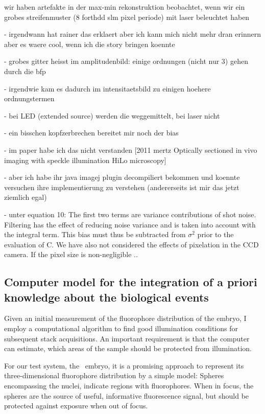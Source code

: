 {\color{red} wir haben artefakte in der max-min rekonstruktion
beobachtet, wenn wir ein grobes streifenmuster (8 forthdd slm pixel
periode) mit laser beleuchtet haben

     - irgendwann hat rainer das erklaert aber ich kann mich nicht
mehr dran erinnern aber es waere cool, wenn ich die story bringen
koennte
     
- grobes gitter heisst im amplitudenbild: einige ordnungen (nicht nur
3) gehen durch die bfp

     - irgendwie kam es dadurch im intensitaetsbild zu einigen hoehere
ordnungstermen

     - bei LED (extended source) werden die weggemittelt, bei laser
nicht

       - ein bisschen kopfzerbrechen bereitet mir noch der bias

       - im paper habe ich das nicht verstanden [2011 mertz Optically
sectioned in vivo imaging with speckle illumination HiLo microscopy]

       - aber ich habe ihr java imagej plugin decompiliert bekommen
und koennte versuchen ihre implementierung zu verstehen (andererseits
ist mir das jetzt ziemlich egal)

       - unter equation 10: The first two terms are variance
contributions of shot noise. Filtering has the effect of reducing
noise variance and is taken into account with the integral term. This
bias must thus be subtracted from $\sigma^2$ prior to the evaluation
of C. We have also not considered the effects of pixelation in the CCD
camera. If the pixel size is non-negligible ..  }

\subsection{Computer model for the integration of a priori knowledge
about the biological events} Given an initial measurement of the
fluorophore distribution of the embryo, I employ a computational
algorithm to find good illumination conditions for subsequent stack
acquisitions. An important requirement is that the computer can
estimate, which areas of the sample should be protected from
illumination.

For our test system, the \celegans\ embryo, it is a promising approach
to represent its three-dimensional fluorophore distribution by a
simple model: Spheres encompassing the nuclei, indicate regions with
fluorophores. When in focus, the spheres are the source of useful,
informative fluorescence signal, but should be protected against
exposure when out of focus.

